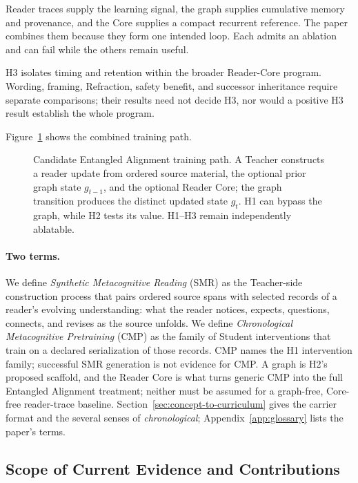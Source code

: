 \documentclass[11pt]{article}
\begin{document}
Reader traces supply the learning signal, the graph supplies cumulative memory
and provenance, and the Core supplies a compact recurrent reference. The paper
combines them because they form one intended loop. Each admits an ablation and can fail while the
others remain useful.

H3 isolates timing and retention within the broader Reader-Core program.
Wording, framing, Refraction, safety benefit, and successor inheritance require
separate comparisons; their results need not decide H3, nor would a positive H3
result establish the whole program.

Figure~\ref{fig:training-path} shows the combined training path.

\begin{figure}[ht]
    \centering
    \resizebox{\textwidth}{!}{}
    \caption{Candidate Entangled Alignment training path. A Teacher constructs a reader update from ordered source material, the optional prior graph state $g_{t-1}$, and the optional Reader Core; the graph transition produces the distinct updated state $g_t$. H1 can bypass the graph, while H2 tests its value. H1--H3 remain independently ablatable.}
    \label{fig:training-path}
\end{figure}

\paragraph{Two terms.}\label{sec:cmp-definition}

We define \emph{Synthetic Metacognitive Reading} (SMR) as the Teacher-side
construction process that pairs ordered source spans with selected records of a
reader's evolving understanding: what the reader notices, expects, questions,
connects, and revises as the source unfolds. We define \emph{Chronological
Metacognitive Pretraining} (CMP) as the family of Student interventions that
train on a declared serialization of those records. CMP names the H1
intervention family; successful SMR generation is not evidence for CMP. A graph
is H2's proposed scaffold, and the Reader Core is what turns generic CMP into the
full Entangled Alignment treatment; neither must be assumed for a graph-free,
Core-free reader-trace baseline. Section~\ref{sec:concept-to-curriculum} gives
the carrier format and the several senses of \emph{chronological};
Appendix~\ref{app:glossary} lists the paper's terms.

\subsection{Scope of Current Evidence and Contributions}\label{sec:contributions}
\label{sec:evidence-boundary}
\end{document}
